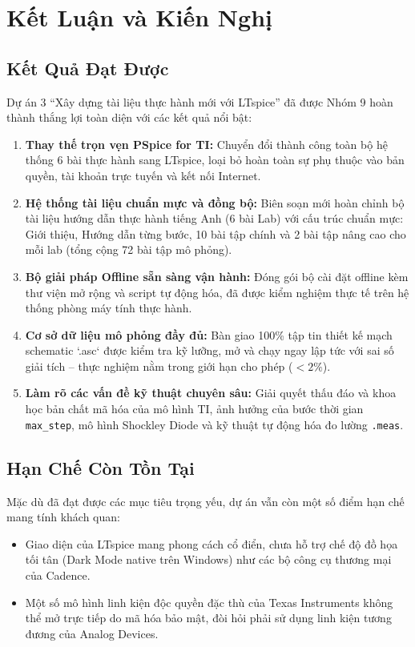 \documentclass[12pt,a4paper]{report}
\begin{document}
\chapter{Kết Luận và Kiến Nghị}

\section{Kết Quả Đạt Được}
Dự án 3 ``Xây dựng tài liệu thực hành mới với LTspice'' đã được Nhóm 9 hoàn thành thắng lợi toàn diện với các kết quả nổi bật:
\begin{enumerate}
    \item \textbf{Thay thế trọn vẹn PSpice for TI:} Chuyển đổi thành công toàn bộ hệ thống 6 bài thực hành sang LTspice, loại bỏ hoàn toàn sự phụ thuộc vào bản quyền, tài khoản trực tuyến và kết nối Internet.
    \item \textbf{Hệ thống tài liệu chuẩn mực và đồng bộ:} Biên soạn mới hoàn chỉnh bộ tài liệu hướng dẫn thực hành tiếng Anh (6 bài Lab) với cấu trúc chuẩn mực: Giới thiệu, Hướng dẫn từng bước, 10 bài tập chính và 2 bài tập nâng cao cho mỗi lab (tổng cộng 72 bài tập mô phỏng).
    \item \textbf{Bộ giải pháp Offline sẵn sàng vận hành:} Đóng gói bộ cài đặt offline kèm thư viện mở rộng và script tự động hóa, đã được kiểm nghiệm thực tế trên hệ thống phòng máy tính thực hành.
    \item \textbf{Cơ sở dữ liệu mô phỏng đầy đủ:} Bàn giao 100\% tập tin thiết kế mạch schematic `.asc` được kiểm tra kỹ lưỡng, mở và chạy ngay lập tức với sai số giải tích -- thực nghiệm nằm trong giới hạn cho phép ($<2\%$).
    \item \textbf{Làm rõ các vấn đề kỹ thuật chuyên sâu:} Giải quyết thấu đáo và khoa học bản chất mã hóa của mô hình TI, ảnh hưởng của bước thời gian \texttt{max\_step}, mô hình Shockley Diode và kỹ thuật tự động hóa đo lường \lstinline|.meas|.
\end{enumerate}

\section{Hạn Chế Còn Tồn Tại}
Mặc dù đã đạt được các mục tiêu trọng yếu, dự án vẫn còn một số điểm hạn chế mang tính khách quan:
\begin{itemize}[noitemsep]
    \item Giao diện của LTspice mang phong cách cổ điển, chưa hỗ trợ chế độ đồ họa tối tân (Dark Mode native trên Windows) như các bộ công cụ thương mại của Cadence.
    \item Một số mô hình linh kiện độc quyền đặc thù của Texas Instruments không thể mở trực tiếp do mã hóa bảo mật, đòi hỏi phải sử dụng linh kiện tương đương của Analog Devices.
\end{itemize}
\end{document}
